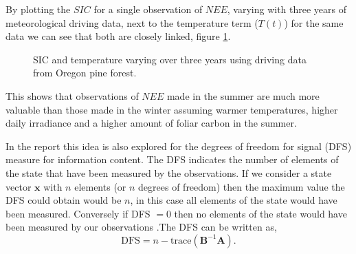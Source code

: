 \documentclass[11pt]{article}
\begin{document}
By plotting the $SIC$ for a single observation of $NEE$, varying with three years of meteorological driving data, next to the temperature term ($T(t)$) for the same data we can see that both are closely linked, figure \ref{fig:SICNEET}.
\begin{figure}[ht]
\centering
{}
\caption{SIC and temperature varying over three years using driving data from Oregon pine forest.}
\label{fig:SICNEET}
\end{figure}
This shows that observations of $NEE$ made in the summer are much more valuable than those made in the winter assuming warmer temperatures, higher daily irradiance and a higher amount of foliar carbon in the summer.

In the report this idea is also explored for the degrees of freedom for signal (DFS) measure for information content. The DFS indicates the number of elements of the state that have been measured by the observations. If we consider a state vector $\textbf{x}$ with $n$ elements (or $n$ degrees of freedom) then the maximum value the DFS could obtain would be $n$, in this case all elements of the state would have been measured. Conversely if DFS $= 0$ then no elements of the state would have been measured by our observations \cite{fowler2011measures}.The DFS can be written as,
\begin{equation}
\text{DFS} = n - \text{trace}(\mathbf{B}^{-1}\mathbf{A}).
\end{equation}
\end{document}
